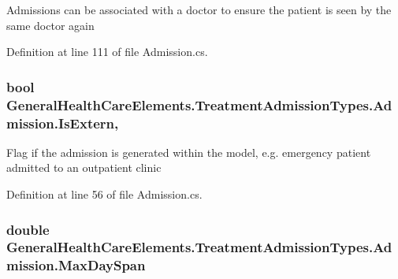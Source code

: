 Admissions can be associated with a doctor to ensure the patient is seen by the same doctor again 



Definition at line 111 of file Admission.\+cs.

\subsubsection[{\texorpdfstring{Is\+Extern}{IsExtern}}]{\setlength{\rightskip}{0pt plus 5cm}bool General\+Health\+Care\+Elements.\+Treatment\+Admission\+Types.\+Admission.\+Is\+Extern\hspace{0.3cm}{\ttfamily [get]}, {\ttfamily [set]}}\hypertarget{class_general_health_care_elements_1_1_treatment_admission_types_1_1_admission_a2fa09f1f9decae62cf9ac3f4f7b5c2fd}{}\label{class_general_health_care_elements_1_1_treatment_admission_types_1_1_admission_a2fa09f1f9decae62cf9ac3f4f7b5c2fd}


Flag if the admission is generated within the model, e.\+g. emergency patient admitted to an outpatient clinic 



Definition at line 56 of file Admission.\+cs.

\subsubsection[{\texorpdfstring{Max\+Day\+Span}{MaxDaySpan}}]{\setlength{\rightskip}{0pt plus 5cm}double General\+Health\+Care\+Elements.\+Treatment\+Admission\+Types.\+Admission.\+Max\+Day\+Span\hspace{0.3cm}{\ttfamily [get]}}\hypertarget{class_general_health_care_elements_1_1_treatment_admission_types_1_1_admission_a53649a5307120f80b1b543ae09e602a5}{}\label{class_general_health_care_elements_1_1_treatment_admission_types_1_1_admission_a53649a5307120f80b1b543ae09e602a5}


